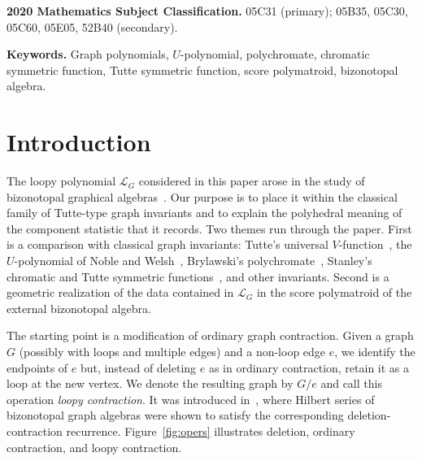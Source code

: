 \documentclass[11pt]{article}
\theoremstyle{plain}
\theoremstyle{definition}
\renewcommand{\mathcal}{\mathscr}
\newcommand{\LL}{\mathcal{L}}    %
\numberwithin{equation}{section}
\begin{document}
\tableofcontents
\medskip
{\small
\noindent\textbf{2020 Mathematics Subject Classification.}
05C31 (primary); 05B35, 05C30, 05C60, 05E05, 52B40 (secondary).

\smallskip
\noindent\textbf{Keywords.}
Graph polynomials, $U$-polynomial, polychromate, chromatic symmetric function,
Tutte symmetric function, score polymatroid, bizonotopal algebra.
}

\section{Introduction}\label{sec:intro}
The loopy polynomial $\LL_G$ considered in this paper arose in the study of bizonotopal graphical algebras~\cite{KNSV}.  Our purpose is to place it within the classical family of
Tutte-type graph invariants and to explain the polyhedral meaning of the component statistic that it records.
Two themes run through the paper. First is a comparison with classical graph invariants:
Tutte's universal $V$-function~\cite{Tu1},
the $U$-polynomial of Noble and Welsh~\cite{NW}, Brylawski's polychromate~\cite{Bry},
Stanley's chromatic and Tutte symmetric functions~\cite{Sta,Sta2}, and other invariants.
Second is a geometric realization of the data contained in $\LL_G$ in the score polymatroid
of the external bizonotopal algebra.

The starting point is a modification of ordinary graph contraction.
Given a graph $G$ (possibly with loops and multiple edges) and a non-loop edge $e$,
we identify the endpoints of $e$ but, instead of deleting $e$ as in ordinary contraction,
retain it as a loop at the new vertex.  We denote the resulting graph by $G/e$ and call
this operation \emph{loopy contraction}.  It was introduced in~\cite{KNSV},
where Hilbert series of bizonotopal graph algebras were shown to satisfy the corresponding
deletion-contraction recurrence. Figure~\ref{fig:opers} illustrates deletion,
ordinary contraction, and loopy contraction.
\end{document}

